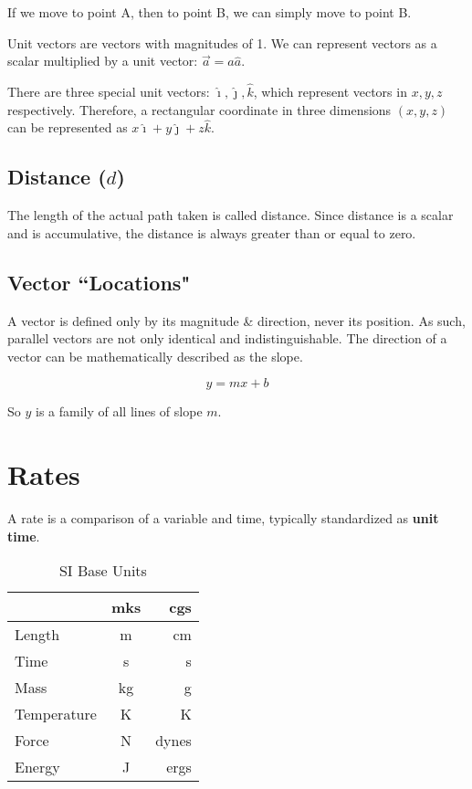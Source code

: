 \documentclass[letterpaper]{article}
\begin{document}
If we move to point A, then to point B, we can simply move to point B.

Unit vectors are vectors with magnitudes of 1.
We can represent vectors as a scalar multiplied by a unit vector:
$\vec{a} = a \hat{a}$.

There are three special unit vectors: $\hat{\imath}, \hat{\jmath}, \hat{k}$, which
represent vectors in $x, y, z$ respectively. Therefore, a rectangular
coordinate in three dimensions $(x, y, z)$ can be represented as
$x\hat{\imath} + y\hat{\jmath} + z\hat{k}$.

\subsection{Distance ($d$)}
The length of the actual path taken is called distance.
Since distance is a scalar and is accumulative, the distance is always
greater than or equal to zero.

\subsection{Vector ``Locations"}

A vector is defined only by its magnitude \& direction, never its position.
As such, parallel vectors are not only identical and indistinguishable. 
The direction of a vector can be mathematically described as the slope.

\[
    y = mx + b
\]

So $y$ is a family of all lines of slope $m$.

\section{Rates}

A rate is a comparison of a variable and time, typically standardized as
{\bf unit time}.

\begin{table}[ht]\label{SiUnitsTable}
\centering
\caption{SI Base Units}



\begin{tabular}{l| c r} 
    & mks & cgs\\ \hline
    Length & m & cm\\
    Time & s & s\\
    Mass & kg & g\\
    Temperature & K & K\\
    Force & N & dynes\\
    Energy & J & ergs\\
\end{tabular}
\end{table}
\end{document}
